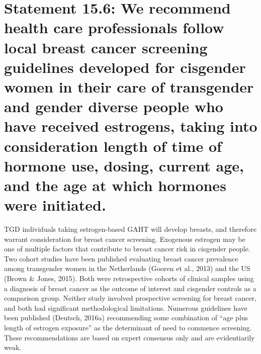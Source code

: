 \documentclass[
]{book}
\begin{document}
\hypertarget{statement-15.6-we-recommend-health-care-professionals-follow-local-breast-cancer-screening-guidelines-developed-for-cisgender-women-in-their-care-of-transgender-and-gender-diverse-people-who-have-received-estrogens-taking-into-consideration-length-of-time-of-hormone-use-dosing-current-age-and-the-age-at-which-hormones-were-initiated.}{%
\section*{Statement 15.6: We recommend health care professionals follow local breast cancer screening guidelines developed for cisgender women in their care of transgender and gender diverse people who have received estrogens, taking into consideration length of time of hormone use, dosing, current age, and the age at which hormones were initiated.}\label{statement-15.6-we-recommend-health-care-professionals-follow-local-breast-cancer-screening-guidelines-developed-for-cisgender-women-in-their-care-of-transgender-and-gender-diverse-people-who-have-received-estrogens-taking-into-consideration-length-of-time-of-hormone-use-dosing-current-age-and-the-age-at-which-hormones-were-initiated.}}

TGD individuals taking estrogen-based GAHT
will develop breasts, and therefore warrant consideration for breast cancer screening. Exogenous
estrogen may be one of multiple factors that contribute to breast cancer risk in cisgender people.
Two cohort studies have been published evaluating breast cancer prevalence among transgender
women in the Netherlands (Gooren et al., 2013)
and the US (Brown \& Jones, 2015). Both were
retrospective cohorts of clinical samples using a
diagnosis of breast cancer as the outcome of
interest and cisgender controls as a comparison
group. Neither study involved prospective screening for breast cancer, and both had significant
methodological limitations. Numerous guidelines
have been published (Deutsch, 2016a) recommending some combination of ``age plus length
of estrogen exposure'' as the determinant of need
to commence screening. These recommendations
are based on expert consensus only and are evidentiarily weak.
\end{document}
